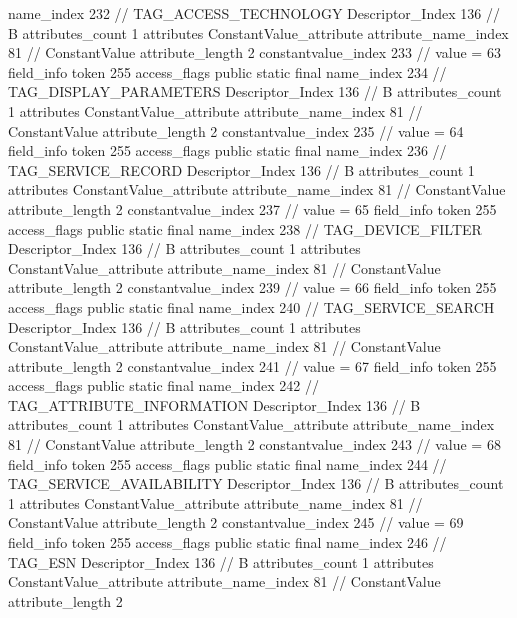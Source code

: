 {{{{{				name_index	232		// TAG_ACCESS_TECHNOLOGY
				Descriptor_Index	136		// B
				attributes_count	1
				attributes {
				ConstantValue_attribute {
					attribute_name_index	81		// ConstantValue
					attribute_length	2
					constantvalue_index	233		// value = 63
				}
				}
			}
			field_info {
				token	255
				access_flags	public static final
				name_index	234		// TAG_DISPLAY_PARAMETERS
				Descriptor_Index	136		// B
				attributes_count	1
				attributes {
				ConstantValue_attribute {
					attribute_name_index	81		// ConstantValue
					attribute_length	2
					constantvalue_index	235		// value = 64
				}
				}
			}
			field_info {
				token	255
				access_flags	public static final
				name_index	236		// TAG_SERVICE_RECORD
				Descriptor_Index	136		// B
				attributes_count	1
				attributes {
				ConstantValue_attribute {
					attribute_name_index	81		// ConstantValue
					attribute_length	2
					constantvalue_index	237		// value = 65
				}
				}
			}
			field_info {
				token	255
				access_flags	public static final
				name_index	238		// TAG_DEVICE_FILTER
				Descriptor_Index	136		// B
				attributes_count	1
				attributes {
				ConstantValue_attribute {
					attribute_name_index	81		// ConstantValue
					attribute_length	2
					constantvalue_index	239		// value = 66
				}
				}
			}
			field_info {
				token	255
				access_flags	public static final
				name_index	240		// TAG_SERVICE_SEARCH
				Descriptor_Index	136		// B
				attributes_count	1
				attributes {
				ConstantValue_attribute {
					attribute_name_index	81		// ConstantValue
					attribute_length	2
					constantvalue_index	241		// value = 67
				}
				}
			}
			field_info {
				token	255
				access_flags	public static final
				name_index	242		// TAG_ATTRIBUTE_INFORMATION
				Descriptor_Index	136		// B
				attributes_count	1
				attributes {
				ConstantValue_attribute {
					attribute_name_index	81		// ConstantValue
					attribute_length	2
					constantvalue_index	243		// value = 68
				}
				}
			}
			field_info {
				token	255
				access_flags	public static final
				name_index	244		// TAG_SERVICE_AVAILABILITY
				Descriptor_Index	136		// B
				attributes_count	1
				attributes {
				ConstantValue_attribute {
					attribute_name_index	81		// ConstantValue
					attribute_length	2
					constantvalue_index	245		// value = 69
				}
				}
			}
			field_info {
				token	255
				access_flags	public static final
				name_index	246		// TAG_ESN
				Descriptor_Index	136		// B
				attributes_count	1
				attributes {
				ConstantValue_attribute {
					attribute_name_index	81		// ConstantValue
					attribute_length	2
}}}}}}}
